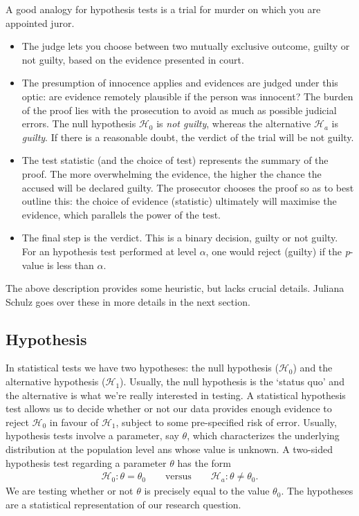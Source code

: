 \documentclass[
  11pt,
  letterpaper,
]{book}
\providecommand{\tightlist}{%
  \setlength{\itemsep}{0pt}\setlength{\parskip}{0pt}}
\theoremstyle{definition}
\theoremstyle{definition}
\theoremstyle{definition}
\theoremstyle{definition}
\theoremstyle{remark}
\begin{document}
A good analogy for hypothesis tests is a trial for murder on which you are appointed juror.

\begin{itemize}
\tightlist
\item
  The judge lets you choose between two mutually exclusive outcome, guilty or not guilty, based on the evidence presented in court.
\item
  The presumption of innocence applies and evidences are judged under this optic: are evidence remotely plausible if the person was innocent? The burden of the proof lies with the prosecution to avoid as much as possible judicial errors. The null hypothesis \(\mathscr{H}_0\) is \emph{not guilty}, whereas the alternative \(\mathscr{H}_a\) is \emph{guilty}. If there is a reasonable doubt, the verdict of the trial will be not guilty.
\item
  The test statistic (and the choice of test) represents the summary of the proof. The more overwhelming the evidence, the higher the chance the accused will be declared guilty. The prosecutor chooses the proof so as to best outline this: the choice of evidence (statistic) ultimately will maximise the evidence, which parallels the power of the test.
\item
  The final step is the verdict. This is a binary decision, guilty or not guilty. For an hypothesis test performed at level \(\alpha\), one would reject (guilty) if the \emph{p}-value is less than \(\alpha\).
\end{itemize}

The above description provides some heuristic, but lacks crucial details. Juliana Schulz goes over these in more details in the next section.

\hypertarget{hypothesis}{%
\subsection{Hypothesis}\label{hypothesis}}

In statistical tests we have two hypotheses: the null hypothesis (\(\mathscr{H}_0\)) and the alternative hypothesis (\(\mathscr{H}_1\)). Usually, the null hypothesis is the `status quo' and the alternative is what we're really interested in testing. A statistical hypothesis test allows us to decide whether or not our data provides enough evidence to reject \(\mathscr{H}_0\) in favour of \(\mathscr{H}_1\), subject to some pre-specified risk of error. Usually, hypothesis tests involve a parameter, say \(\theta\), which characterizes the underlying distribution at the population level ans whose value is unknown. A two-sided hypothesis test regarding a parameter \(\theta\) has the form
\begin{align*}
\mathscr{H}_0: \theta=\theta_0 \qquad \text{versus} \qquad \mathscr{H}_a:\theta \neq \theta_0.
\end{align*}
We are testing whether or not \(\theta\) is precisely equal to the value \(\theta_0\). The hypotheses are a statistical representation of our research question.
\end{document}

